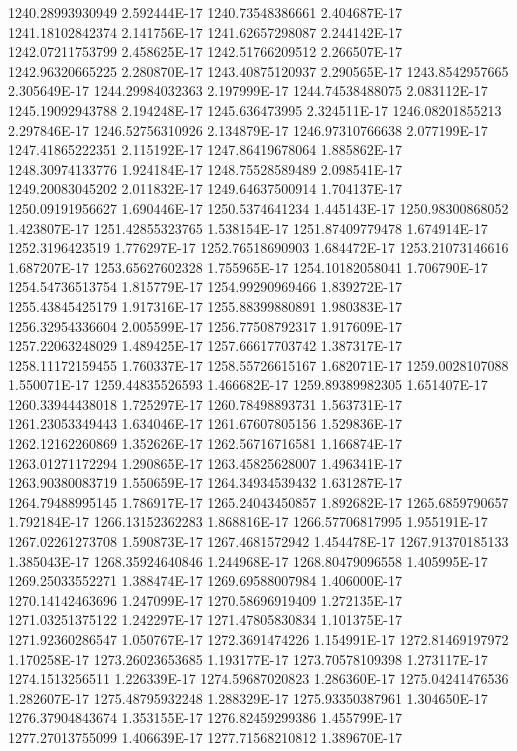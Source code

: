 1240.28993930949  2.592444E-17
1240.73548386661  2.404687E-17
1241.18102842374  2.141756E-17
1241.62657298087  2.244142E-17
1242.07211753799  2.458625E-17
1242.51766209512  2.266507E-17
1242.96320665225  2.280870E-17
1243.40875120937  2.290565E-17
1243.8542957665  2.305649E-17
1244.29984032363  2.197999E-17
1244.74538488075  2.083112E-17
1245.19092943788  2.194248E-17
1245.636473995  2.324511E-17
1246.08201855213  2.297846E-17
1246.52756310926  2.134879E-17
1246.97310766638  2.077199E-17
1247.41865222351  2.115192E-17
1247.86419678064  1.885862E-17
1248.30974133776  1.924184E-17
1248.75528589489  2.098541E-17
1249.20083045202  2.011832E-17
1249.64637500914  1.704137E-17
1250.09191956627  1.690446E-17
1250.5374641234  1.445143E-17
1250.98300868052  1.423807E-17
1251.42855323765  1.538154E-17
1251.87409779478  1.674914E-17
1252.3196423519  1.776297E-17
1252.76518690903  1.684472E-17
1253.21073146616  1.687207E-17
1253.65627602328  1.755965E-17
1254.10182058041  1.706790E-17
1254.54736513754  1.815779E-17
1254.99290969466  1.839272E-17
1255.43845425179  1.917316E-17
1255.88399880891  1.980383E-17
1256.32954336604  2.005599E-17
1256.77508792317  1.917609E-17
1257.22063248029  1.489425E-17
1257.66617703742  1.387317E-17
1258.11172159455  1.760337E-17
1258.55726615167  1.682071E-17
1259.0028107088  1.550071E-17
1259.44835526593  1.466682E-17
1259.89389982305  1.651407E-17
1260.33944438018  1.725297E-17
1260.78498893731  1.563731E-17
1261.23053349443  1.634046E-17
1261.67607805156  1.529836E-17
1262.12162260869  1.352626E-17
1262.56716716581  1.166874E-17
1263.01271172294  1.290865E-17
1263.45825628007  1.496341E-17
1263.90380083719  1.550659E-17
1264.34934539432  1.631287E-17
1264.79488995145  1.786917E-17
1265.24043450857  1.892682E-17
1265.6859790657  1.792184E-17
1266.13152362283  1.868816E-17
1266.57706817995  1.955191E-17
1267.02261273708  1.590873E-17
1267.4681572942  1.454478E-17
1267.91370185133  1.385043E-17
1268.35924640846  1.244968E-17
1268.80479096558  1.405995E-17
1269.25033552271  1.388474E-17
1269.69588007984  1.406000E-17
1270.14142463696  1.247099E-17
1270.58696919409  1.272135E-17
1271.03251375122  1.242297E-17
1271.47805830834  1.101375E-17
1271.92360286547  1.050767E-17
1272.3691474226  1.154991E-17
1272.81469197972  1.170258E-17
1273.26023653685  1.193177E-17
1273.70578109398  1.273117E-17
1274.1513256511  1.226339E-17
1274.59687020823  1.286360E-17
1275.04241476536  1.282607E-17
1275.48795932248  1.288329E-17
1275.93350387961  1.304650E-17
1276.37904843674  1.353155E-17
1276.82459299386  1.455799E-17
1277.27013755099  1.406639E-17
1277.71568210812  1.389670E-17
